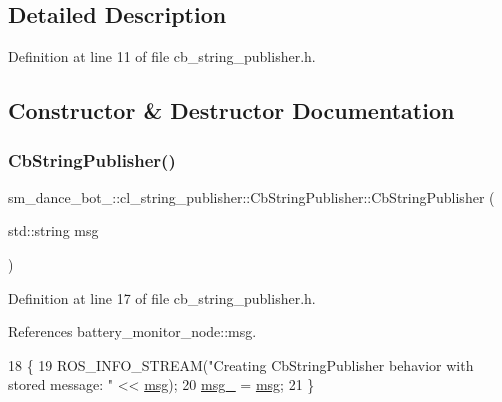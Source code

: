 \subsection{Detailed Description}


Definition at line 11 of file cb\+\_\+string\+\_\+publisher.\+h.



\subsection{Constructor \& Destructor Documentation}
\mbox{\label{classsm__dance__bot__2_1_1cl__string__publisher_1_1CbStringPublisher_a557c3ef581e3aa4d30ab4218b7d0f10b}} 
\subsubsection{\texorpdfstring{Cb\+String\+Publisher()}{CbStringPublisher()}}
{\footnotesize\ttfamily sm\+\_\+dance\+\_\+bot\+\_\+::cl\+\_\+string\+\_\+publisher\+::\+Cb\+String\+Publisher\+::\+Cb\+String\+Publisher (\begin{DoxyParamCaption}\item[{std\+::string}]{msg }\end{DoxyParamCaption})\hspace{0.3cm}{\ttfamily [inline]}}



Definition at line 17 of file cb\+\_\+string\+\_\+publisher.\+h.



References battery\+\_\+monitor\+\_\+node\+::msg.


\begin{DoxyCode}
18     \{
19         ROS\_INFO\_STREAM(\textcolor{stringliteral}{"Creating CbStringPublisher behavior with stored message: "} << 
      \hyperlink{namespacebattery__monitor__node_ab1920c64448816edd4064e494275fdff}{msg});
20         \hyperlink{classsm__dance__bot__2_1_1cl__string__publisher_1_1CbStringPublisher_aa4ec5323d074594371424668619997da}{msg\_} = \hyperlink{namespacebattery__monitor__node_ab1920c64448816edd4064e494275fdff}{msg};
21     \}
\end{DoxyCode}



